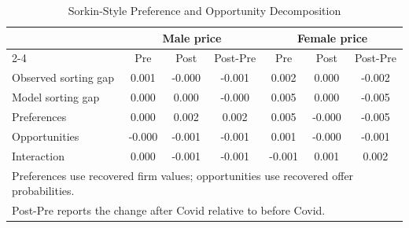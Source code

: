 \begin{table}[!htbp]\centering
\caption{Sorkin-Style Preference and Opportunity Decomposition}
\begin{tabular}{lcccccc}
\hline
 & \multicolumn{3}{c}{Male price} & \multicolumn{3}{c}{Female price} \\
\cline{2-4} \cline{5-7}
 & Pre & Post & Post-Pre & Pre & Post & Post-Pre
\\ \hline
Observed sorting gap & 0.001 & -0.000 & -0.001 & 0.002 & 0.000 & -0.002 \\
Model sorting gap & 0.000 & 0.000 & -0.000 & 0.005 & 0.000 & -0.005 \\
Preferences & 0.000 & 0.002 & 0.002 & 0.005 & -0.000 & -0.005 \\
Opportunities & -0.000 & -0.001 & -0.001 & 0.001 & -0.000 & -0.001 \\
Interaction & 0.000 & -0.001 & -0.001 & -0.001 & 0.001 & 0.002 \\
\hline
\multicolumn{7}{l}{\footnotesize{Preferences use recovered firm values; opportunities use recovered offer probabilities.}} \\
\multicolumn{7}{l}{\footnotesize{Post-Pre reports the change after Covid relative to before Covid.}} \\
\end{tabular}
\end{table}
